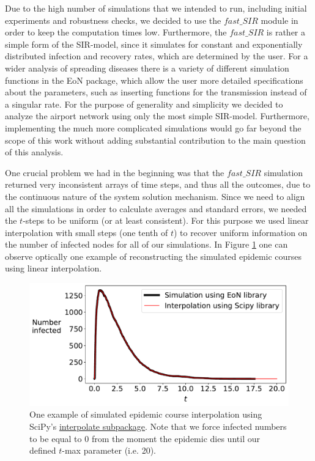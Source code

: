 \documentclass{Template_resources/netsci-project}
\begin{document}
Due to the high number of simulations that we intended to run, including initial experiments and robustness checks, we decided to use the $fast\_SIR$ module in order to keep the computation times low. Furthermore, the $fast\_SIR$ is rather a simple form of the SIR-model, since it simulates for constant and exponentially distributed infection and recovery rates, which are determined by the user. For a wider analysis of spreading diseases there is a variety of different simulation functions in the EoN package, which allow the user more detailed specifications about the parameters, such as inserting functions for the transmission instead of a singular rate. For the purpose of generality and simplicity we decided to analyze the airport network using only the most simple SIR-model. Furthermore, implementing the much more complicated simulations would go far beyond the scope of this work without adding substantial contribution to the main question of this analysis.

One crucial problem we had in the beginning was that the $fast\_SIR$ simulation returned very inconsistent arrays of time steps, and thus all the outcomes, due to the continuous nature of the system solution mechanism. Since we need to align all the simulations in order to calculate averages and standard errors, we needed the $t$-steps to be uniform (or at least consistent). For this purpose we used linear interpolation with small steps (one tenth of $t$) to recover uniform information on the number of infected nodes for all of our simulations. In Figure \ref{fig:interpolation_test} one can observe optically one example of reconstructing the simulated epidemic courses using linear interpolation. 
\begin{figure}[!h]
    \centering
    \includegraphics[width=0.5\linewidth]{Figures/interpolation_test.pdf}
    \caption{One example of simulated epidemic course interpolation using SciPy's \href{https://docs.scipy.org/doc/scipy/reference/interpolate.html}{interpolate subpackage}. Note that we force infected numbers to be equal to 0 from the moment the epidemic dies until our defined $t$-max parameter (i.e. 20).}
    \label{fig:interpolation_test}
\end{figure}
\end{document}
